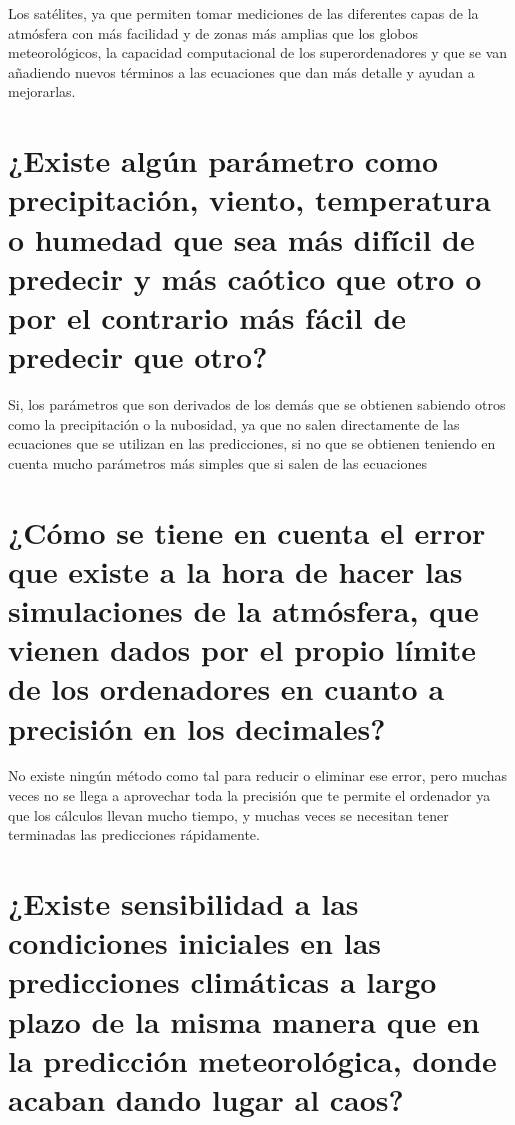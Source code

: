 \documentclass[
  10pt,
  a4paper,
  DIV=11,
  numbers=noendperiod,
  open=any]{scrreprt}
\numberwithin{equation}{chapter}
\numberwithin{equation}{section}
\renewcommand{\[}{\begin{equation}}
\renewcommand{\]}{\end{equation}}
\begin{document}
Los satélites, ya que permiten tomar mediciones de las diferentes capas
de la atmósfera con más facilidad y de zonas más amplias que los globos
meteorológicos, la capacidad computacional de los superordenadores y que
se van añadiendo nuevos términos a las ecuaciones que dan más detalle y
ayudan a mejorarlas.

\section{¿Existe algún parámetro como precipitación, viento, temperatura
o humedad que sea más difícil de predecir y más caótico que otro o por
el contrario más fácil de predecir que
otro?}\label{existe-alguxfan-paruxe1metro-como-precipitaciuxf3n-viento-temperatura-o-humedad-que-sea-muxe1s-difuxedcil-de-predecir-y-muxe1s-cauxf3tico-que-otro-o-por-el-contrario-muxe1s-fuxe1cil-de-predecir-que-otro}

Si, los parámetros que son derivados de los demás que se obtienen
sabiendo otros como la precipitación o la nubosidad, ya que no salen
directamente de las ecuaciones que se utilizan en las predicciones, si
no que se obtienen teniendo en cuenta mucho parámetros más simples que
si salen de las ecuaciones

\section{¿Cómo se tiene en cuenta el error que existe a la hora de hacer
las simulaciones de la atmósfera, que vienen dados por el propio límite
de los ordenadores en cuanto a precisión en los
decimales?}\label{cuxf3mo-se-tiene-en-cuenta-el-error-que-existe-a-la-hora-de-hacer-las-simulaciones-de-la-atmuxf3sfera-que-vienen-dados-por-el-propio-luxedmite-de-los-ordenadores-en-cuanto-a-precisiuxf3n-en-los-decimales}

No existe ningún método como tal para reducir o eliminar ese error, pero
muchas veces no se llega a aprovechar toda la precisión que te permite
el ordenador ya que los cálculos llevan mucho tiempo, y muchas veces se
necesitan tener terminadas las predicciones rápidamente.

\section{¿Existe sensibilidad a las condiciones iniciales en las
predicciones climáticas a largo plazo de la misma manera que en la
predicción meteorológica, donde acaban dando lugar al
caos?}\label{existe-sensibilidad-a-las-condiciones-iniciales-en-las-predicciones-climuxe1ticas-a-largo-plazo-de-la-misma-manera-que-en-la-predicciuxf3n-meteoroluxf3gica-donde-acaban-dando-lugar-al-caos}
\end{document}

